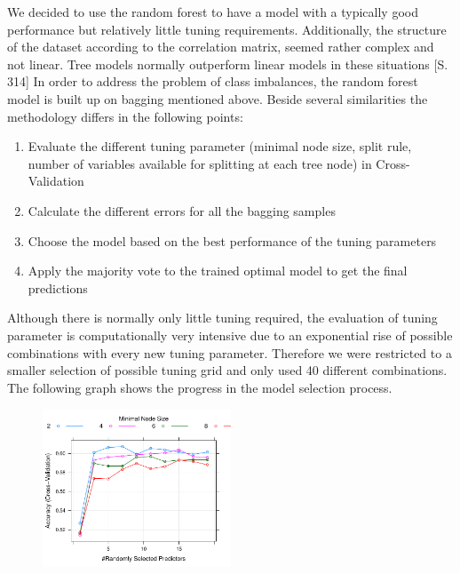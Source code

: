 \documentclass[11pt]{article}
\begin{document}
We decided to use the random forest to have a model with a typically good performance but relatively little tuning requirements. Additionally, the structure of the dataset according to the correlation matrix, seemed rather complex and not linear. Tree models normally outperform linear models in these situations \cite{James}[S. 314] In order to address the problem of class imbalances, the random forest model is built up on bagging mentioned above. Beside several similarities the methodology differs in the following points:
\begin{enumerate}
\item Evaluate the different tuning parameter (minimal node size, split rule, number of variables available for splitting at each tree node) in Cross-Validation
\item Calculate the different errors for all the bagging samples
\item Choose the model based on the best performance of the tuning parameters
\item Apply the majority vote to the trained optimal model to get the final predictions
\end{enumerate}

Although there is normally only little tuning required, the evaluation of tuning parameter is computationally very intensive due to an exponential rise of possible combinations with every new tuning parameter. Therefore we were restricted to a smaller selection of possible tuning grid and only used 40 different combinations. The following graph shows the progress in the model selection process. \\

\begin{figure}[H]
\centering
{} \label{rf_tuning}

       \includegraphics[width=0.5\textwidth]{Plots/rf_progress.pdf}
 

\end{figure}
\end{document}
